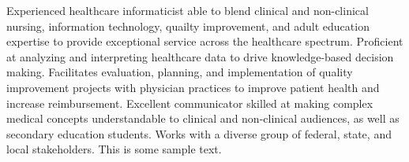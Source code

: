 

\begin{cvparagraph}

Experienced healthcare informaticist able to blend clinical and non-clinical nursing, information technology, quailty improvement, and adult education expertise to provide exceptional service across the healthcare spectrum.  Proficient at analyzing and interpreting healthcare data to drive knowledge-based decision making.  Facilitates evaluation, planning, and implementation of quality improvement projects with physician practices to improve patient health and increase reimbursement.  Excellent communicator skilled at making complex medical concepts understandable to clinical and non-clinical audiences, as well as secondary education students. Works with a diverse group of federal, state, and local stakeholders. This is some sample text.
\end{cvparagraph}

